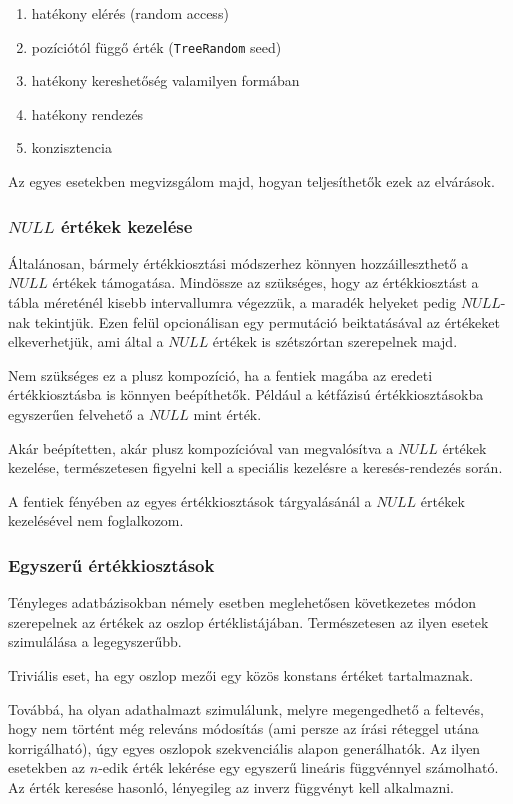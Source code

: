 \documentclass[
    parspace,
    noindent,
    nohyp,
]{elteiktdk}[2023/04/10]
\begin{document}
\begin{enumerate}
  \item hatékony elérés (random access)
  \item pozíciótól függő érték (\texttt{TreeRandom} seed)
  \item hatékony kereshetőség valamilyen formában
  \item hatékony rendezés
  \item konzisztencia
\end{enumerate}

Az egyes esetekben megvizsgálom majd, hogyan teljesíthetők ezek az elvárások.

\subsubsection{$NULL$ értékek kezelése}

Általánosan, bármely értékkiosztási módszerhez könnyen hozzáilleszthető a $NULL$ értékek támogatása.
Mindössze az szükséges, hogy az értékkiosztást a tábla méreténél kisebb intervallumra végezzük,
a maradék helyeket pedig $NULL$-nak tekintjük.
Ezen felül opcionálisan egy permutáció beiktatásával az értékeket elkeverhetjük,
ami által a $NULL$ értékek is szétszórtan szerepelnek majd.

Nem szükséges ez a plusz kompozíció,
ha a fentiek magába az eredeti értékkiosztásba is könnyen beépíthetők.
Például a kétfázisú értékkiosztásokba egyszerűen felvehető a $NULL$ mint érték.

Akár beépítetten, akár plusz kompozícióval van megvalósítva a $NULL$ értékek kezelése,
természetesen figyelni kell a speciális kezelésre a keresés-rendezés során.

A fentiek fényében az egyes értékkiosztások tárgyalásánál a $NULL$ értékek kezelésével nem foglalkozom.

\subsubsection{Egyszerű értékkiosztások}

Tényleges adatbázisokban némely esetben meglehetősen következetes módon
szerepelnek az értékek az oszlop értéklistájában.
Természetesen az ilyen esetek szimulálása a legegyszerűbb.

Triviális eset, ha egy oszlop mezői egy közös konstans értéket tartalmaznak.

Továbbá, ha olyan adathalmazt szimulálunk, melyre megengedhető a feltevés,
hogy nem történt még releváns módosítás
(ami persze az írási réteggel utána korrigálható),
úgy egyes oszlopok szekvenciális alapon generálhatók.
Az ilyen esetekben az $n$-edik érték lekérése
egy egyszerű lineáris függvénnyel számolható.
Az érték keresése hasonló, lényegileg az inverz függvényt kell alkalmazni.
\end{document}
